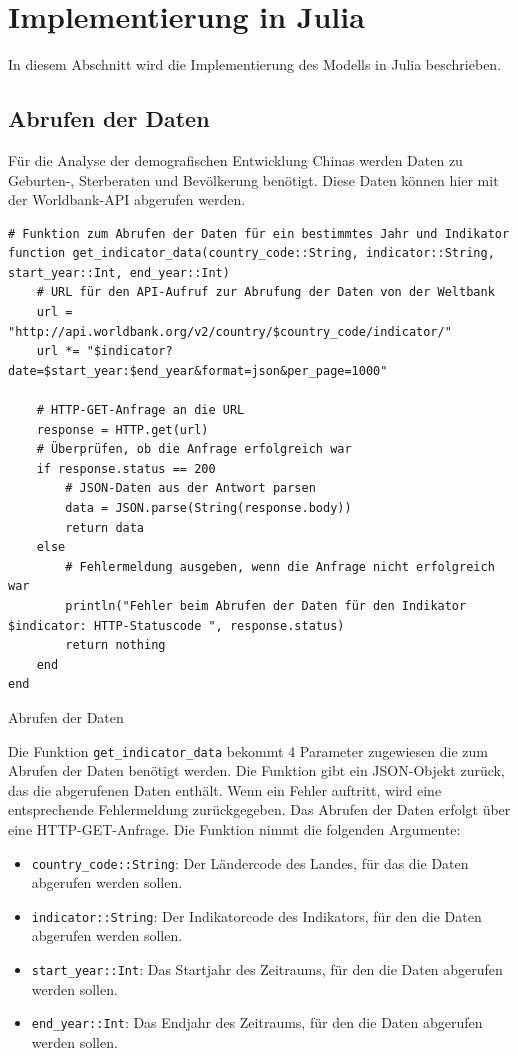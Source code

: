 \section{Implementierung in Julia}
In diesem Abschnitt wird die Implementierung des Modells in Julia beschrieben.

\subsection{Abrufen der Daten}
Für die Analyse der demografischen Entwicklung Chinas werden Daten zu Geburten-, Sterberaten und Bevölkerung benötigt. Diese Daten können hier mit der Worldbank-API abgerufen werden.

\begin{listing}[H]
\begin{verbatim}
# Funktion zum Abrufen der Daten für ein bestimmtes Jahr und Indikator
function get_indicator_data(country_code::String, indicator::String, start_year::Int, end_year::Int)
    # URL für den API-Aufruf zur Abrufung der Daten von der Weltbank
    url = "http://api.worldbank.org/v2/country/$country_code/indicator/"
    url *= "$indicator?date=$start_year:$end_year&format=json&per_page=1000"
  
    # HTTP-GET-Anfrage an die URL
    response = HTTP.get(url)
    # Überprüfen, ob die Anfrage erfolgreich war
    if response.status == 200
        # JSON-Daten aus der Antwort parsen
        data = JSON.parse(String(response.body))
        return data
    else
        # Fehlermeldung ausgeben, wenn die Anfrage nicht erfolgreich war
        println("Fehler beim Abrufen der Daten für den Indikator $indicator: HTTP-Statuscode ", response.status)
        return nothing
    end
end

\end{verbatim}
\caption{Abrufen der Daten}
\end{listing}

Die Funktion \texttt{get\_indicator\_data} bekommt 4 Parameter zugewiesen die zum Abrufen der Daten benötigt werden. Die Funktion gibt ein JSON-Objekt zurück, das die abgerufenen Daten enthält. Wenn ein Fehler auftritt, wird eine entsprechende Fehlermeldung zurückgegeben. Das Abrufen der Daten erfolgt über eine HTTP-GET-Anfrage. Die Funktion nimmt die folgenden Argumente:

\begin{itemize}
    \item \texttt{country\_code::String}: Der Ländercode des Landes, für das die Daten abgerufen werden sollen.
    \item \texttt{indicator::String}: Der Indikatorcode des Indikators, für den die Daten abgerufen werden sollen.
    \item \texttt{start\_year::Int}: Das Startjahr des Zeitraums, für den die Daten abgerufen werden sollen.
    \item \texttt{end\_year::Int}: Das Endjahr des Zeitraums, für den die Daten abgerufen werden sollen.
\end{itemize}

